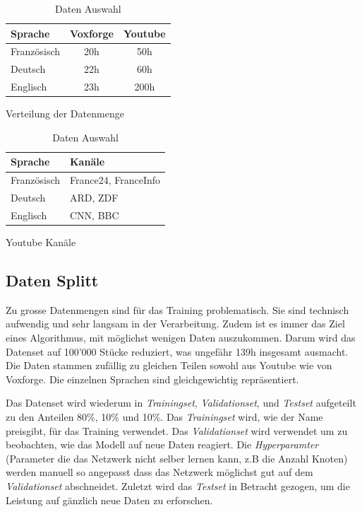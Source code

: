 \begin{table}[h]
    \begin{subtable}[t ]{0.45\textwidth}
        \centering
        \begin{tabular}[t]{l || c c}
        Sprache & Voxforge & Youtube \\
        \hline \hline
        Französisch & 20h & 50h\\
        Deutsch & 22h & 60h\\
        Englisch & 23h & 200h\\
        \end{tabular}
        \caption{Verteilung der Datenmenge}
        \label{tab:amount}
    \end{subtable}
    \hfill
    \begin{subtable}[t ]{0.45\textwidth}
        \centering
        \begin{tabular}[t]{l || l}
        Sprache & Kanäle \\
        \hline \hline
        Französisch & France24, FranceInfo\\
        Deutsch & ARD, ZDF\\
        Englisch & CNN,  BBC
        \end{tabular}
        \caption{Youtube Kanäle}
        \label{tab:channels}
    \end{subtable}
    \caption{Daten Auswahl}
    \label{tab:data}
\end{table}


\subsection{Daten Splitt}
Zu grosse Datenmengen sind für das Training problematisch. Sie sind technisch aufwendig und sehr langsam in der Verarbeitung. Zudem ist es immer das Ziel eines Algorithmus, mit möglichst wenigen Daten auszukommen. Darum wird das Datenset auf 100'000 Stücke reduziert, was ungefähr 139h insgesamt ausmacht. Die Daten stammen zufällig zu gleichen Teilen sowohl aus Youtube wie von Voxforge. Die einzelnen Sprachen sind gleichgewichtig repräsentiert.

Das Datenset wird wiederum in \textit{Trainingset}, \textit{Validationset}, und \textit{Testset} aufgeteilt zu den Anteilen 80\%, 10\% und 10\%. Das \textit{Trainingset} wird, wie der Name preisgibt, für das Training verwendet. Das \textit{Validationset} wird verwendet um zu beobachten, wie das Modell auf neue Daten reagiert. Die \textit{Hyperparamter} (Parameter die das Netzwerk nicht selber lernen kann, z.B die Anzahl Knoten) werden manuell so angepasst dass das Netzwerk möglichst gut auf dem \textit{Validationset} abschneidet. Zuletzt wird das \textit{Testset} in Betracht gezogen, um die Leistung auf gänzlich neue Daten zu erforschen.

